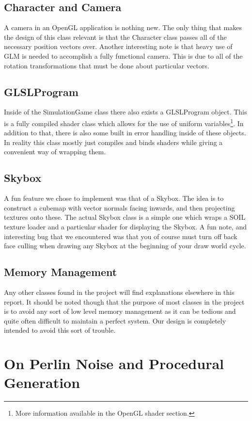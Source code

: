 \documentclass[paper=a4, fontsize=11pt]{scrartcl}
\numberwithin{equation}{section}		%
\numberwithin{figure}{section}			%
\numberwithin{table}{section}				%
\begin{document}
\subsection{Character and Camera}
A camera in an OpenGL application is nothing new. The only thing that makes the design of this class relevant is that the Character class passes all of the necessary position vectors over. Another interesting note is that heavy use of GLM is needed to accomplish a fully functional camera. This is due to all of the rotation transformations that must be done about particular vectors.
\subsection{GLSLProgram}
Inside of the SimulationGame class there also exists a GLSLProgram object. This is a fully compiled shader class which allows for the use of uniform variables\footnote{More information available in the OpenGL shader section.}. In addition to that, there is also some built in error handling inside of these objects. In reality this class mostly just compiles and binds shaders while giving a convenient way of wrapping them.
\subsection{Skybox}
A fun feature we chose to implement was that of a Skybox. The idea is to construct a cubemap with vector normals facing inwards, and then projecting textures onto these. The actual Skybox class is a simple one which wraps a SOIL texture loader and a particular shader for displaying the Skybox. A fun note, and interesting bug that we encountered was that you of course must turn off back face culling when drawing any Skybox at the beginning of your draw world cycle.
\subsection{Memory Management}
Any other classes found in the project will find explanations elsewhere in this report. It should be noted though that the purpose of most classes in the project is to avoid any sort of low level memory management as it can be tedious and quite often difficult to maintain a perfect system. Our design is completely intended to avoid this sort of trouble.

\section{On Perlin Noise and Procedural Generation}
\end{document}
